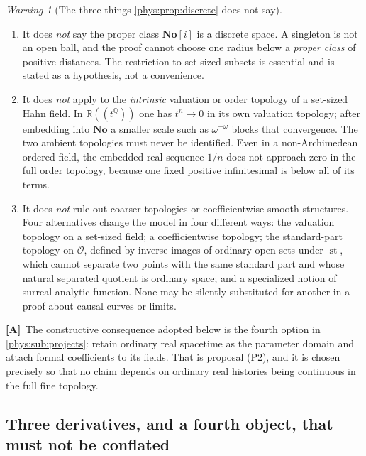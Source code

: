 \documentclass[11pt,letterpaper]{article}
\numberwithin{equation}{section}
\theoremstyle{definition}
\theoremstyle{remark}
\newtheorem{warning}[theorem]{Warning}
\newcommand{\No}{\mathbf{No}}
\newcommand{\SC}{\mathbf{No}[i]}
\newcommand{\R}{\mathbb R}
\newcommand{\Q}{\mathbb Q}
\newcommand{\Ofin}{\mathcal O}
\DeclareMathOperator{\st}{st}
\newcommand{\TA}{\textcolor{TierA}{\textsf{\bfseries[A]}}}
\begin{document}
\begin{warning}[The three things \cref{phys:prop:discrete} does not say]
\label{phys:warn:discrete}
\begin{enumerate}[label=\textup{(\alph*)},leftmargin=2.4em]
\item It does \emph{not} say the proper class $\SC$ is a discrete space. A
singleton is not an open ball, and the proof cannot choose one radius below a
\emph{proper class} of positive distances. The restriction to set-sized subsets
is essential and is stated as a hypothesis, not a convenience.
\item It does \emph{not} apply to the \emph{intrinsic} valuation or order
topology of a set-sized Hahn field. In $\R((t^{\Q}))$ one has $t^{n}\to0$ in
its own valuation topology; after embedding into $\No$ a smaller scale such as
$\omega^{-\omega}$ blocks that convergence. The two ambient topologies must
never be identified. Even in a non-Archimedean ordered field, the embedded
real sequence $1/n$ does not approach zero in the full order topology, because
one fixed positive infinitesimal is below all of its terms.
\item It does \emph{not} rule out coarser topologies or coefficientwise smooth
structures. Four alternatives change the model in four different ways: the
valuation topology on a set-sized field; a coefficientwise topology; the
standard-part topology on $\Ofin$, defined by inverse images of ordinary open
sets under $\st$, which cannot separate two points with the same standard part
and whose natural separated quotient is ordinary space; and a specialized
notion of surreal analytic function. None may be silently substituted for
another in a proof about causal curves or limits.
\end{enumerate}
\end{warning}

\TA\ The constructive consequence adopted below is the fourth option in
\cref{phys:sub:projects}: retain ordinary real spacetime as the parameter
domain and attach formal coefficients to its fields. That is proposal (P2),
and it is chosen precisely so that no claim depends on ordinary real histories
being continuous in the full fine topology.

\subsection{Three derivatives, and a fourth object, that must not be conflated}
\label{phys:sub:derivatives}
\end{document}
